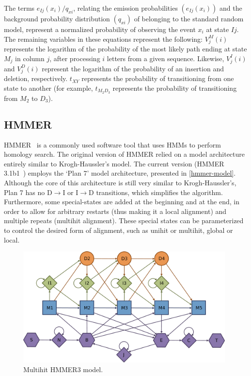 \documentclass{bmcart}
\begin{document}

The terms $e_{Ij}(x_i)/q_{xi}$, relating the emission probabilities $(e_{Ij}(x_i))$ and the background probability distribution $(q_{xi})$ of belonging to the standard random model, represent a normalized probability of observing the event $x_i$ at state $Ij$. The remaining variables in these equations represent the following: $V^M_j(i)$ represents the logarithm of the probability of the most likely path  ending at state $M_j$ in column $j$, after processing $i$ letters from a given sequence. Likewise, $V^I_j(i)$ and $V^D_j(i)$ represent the logarithm of the probability of an insertion and deletion, respectively. $t_{XY}$ represents the probability of transitioning from one state to another (for example, $t_{M_{2} D_3}$ represents the probability of transitioning from $M_{2}$ to $D_3$). 

\subsection*{HMMER}

HMMER~\cite{eddy1998profile} is a commonly used software tool that uses \acp{HMM} to perform homology search. The original version of HMMER relied on a model architecture entirely similar to Krogh-Haussler's model. The current version (HMMER 3.1b1~\cite{eddy2011hmmer3}) employs the `Plan 7' model architecture, presented in \autoref{hmmer-model}. Although the core of this architecture is still very similar to Krogh-Haussler's, Plan 7 has no $\mathrm{D}\rightarrow\mathrm{I}$ or $\mathrm{I}\rightarrow\mathrm{D}$ transitions, which simplifies the algorithm. Furthermore, some special-states are added at the beginning and at the end, in order to allow for arbitrary restarts (thus making it a local alignment) and multiple repeats (multihit alignment). These special states can be parameterized to control the desired form of alignment, such as unihit or multihit, global or local.

\begin{figure}[h!]
  \centering
  \includegraphics[width=0.98\textwidth]{img/hmmer-model.eps}
  \caption{Multihit HMMER3 model.}
  \label{hmmer-model}
\end{figure}
\end{document}
